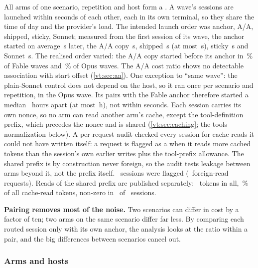All arms of one scenario, repetition and host form a . A wave's sessions are launched within
seconds of each other, each in its own terminal, so they share the time of day and the provider's load.
The intended launch order was anchor, A/A, shipped, sticky, Sonnet; measured from the first session of its wave,
the anchor started on average \StaggerAnchor\,s later, the A/A copy \StaggerAA\,s, shipped \StaggerShipped\,s (at
most \StaggerShippedMax\,s), sticky \StaggerSticky\,s and Sonnet \StaggerSonnet\,s. The realised order varied:
the A/A copy started before its anchor in \RvAAFirstFable\,\% of Fable waves and \RvAAFirstOpus\,\% of Opus waves.
The A/A cost ratio shows no detectable association with start offset (\cref{vt:sec:aa}). One exception to ``same wave'': the plain-Sonnet
control does not depend on the host, so it ran once per scenario and repetition, in the Opus wave. Its pairs with
the Fable anchor therefore started a median \RvSonnetWaveMedianH\ hours apart (at most \RvSonnetWaveMaxH\,h), not
within seconds. Each session carries its own
nonce, so no arm can read another arm's cache, except the tool-definition prefix, which precedes the nonce and is
shared (\cref{vt:sec:caching}; the tools normalization below). A per-request audit checked every
session for cache reads it could not have written itself: a request is flagged as a  when it reads
more cached tokens than the session's own earlier writes plus the tool-prefix allowance. The shared prefix is by
construction never foreign, so the audit tests leakage between arms beyond it, not the prefix itself.
\AuditFlagged\ sessions were flagged (\RgForeignRequests\ foreign-read requests). Reads of the shared prefix are
published separately: \RgCrossTokens\ tokens in all, \RgCrossShare\,\% of all cache-read tokens, non-zero in
\RgCrossSessions\ of \NSessions\ sessions.

\begin{keyidea}
\textbf{Pairing removes most of the noise.} Two scenarios can differ in cost by a factor of ten; two arms on
the same scenario differ far less. By comparing each routed session only with its own anchor, the
analysis looks at the ratio within a pair, and the big differences between scenarios cancel out.
\end{keyidea}

\subsubsection{Arms and hosts}

